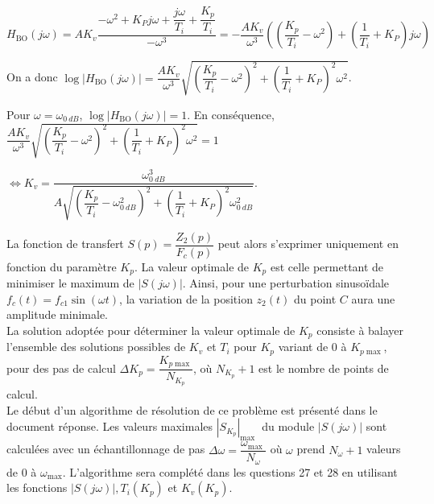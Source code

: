 \ifprof
\begin{corrige}
$H_{\text{BO}}(j\omega)=AK_v\dfrac{-\omega^2 + K_Pj\omega + \dfrac{j\omega}{T_i}+\dfrac{K_p}{T_i }}{-\omega^3}
=-\dfrac{AK_v}{\omega^3}  \left(\left(\dfrac{K_p}{T_i }-\omega^2 \right)+\left(\dfrac{1}{T_i}+ K_P\right)j\omega \right)$

On a donc 
$\log\left|H_{\text{BO}}(j\omega)\right|=\dfrac{AK_v}{\omega^3}  \sqrt{\left(\dfrac{K_p}{T_i }-\omega^2 \right)^2+\left(\dfrac{1}{T_i}+ K_P\right)^2\omega^2}$. 

Pour $\omega=\omega_{\SI{0}{dB}}$, $\log\left|H_{\text{BO}}(j\omega)\right|=1$. En conséquence, 
$\dfrac{AK_v}{\omega^3}  \sqrt{\left(\dfrac{K_p}{T_i }-\omega^2 \right)^2+\left(\dfrac{1}{T_i}+ K_P\right)^2\omega^2}=1 $

$\Leftrightarrow 
K_v  =\dfrac{\omega_{\SI{0}{dB}}^3}{A\sqrt{\left(\dfrac{K_p}{T_i }-\omega_{\SI{0}{dB}}^2 \right)^2+\left(\dfrac{1}{T_i}+ K_P\right)^2\omega_{\SI{0}{dB}}^2}}$.
\end{corrige}
\else
\fi

La fonction de transfert $S(p)=\dfrac{Z_{2}(p)}{F_{c}(p)}$ peut alors s'exprimer uniquement en fonction du paramètre $K_{p}$. La valeur optimale de $K_{p}$ est celle permettant de minimiser le maximum de $|S(j \omega)|$. Ainsi, pour une perturbation sinusoïdale $f_{c}(t)=f_{c 1} \sin (\omega t)$, la variation de la position $z_{2}(t)$ du point $C$ aura une amplitude minimale.\\
La solution adoptée pour déterminer la valeur optimale de $K_{p}$ consiste à balayer l'ensemble des solutions possibles de $K_{v}$ et $T_{i}$ pour $K_{p}$ variant de 0 à $K_{p \max }$, pour des pas de calcul $\Delta K_{p}=\dfrac{K_{p \max }}{N_{K_{p}}}$, où $N_{K_{p}}+1$ est le nombre de points de calcul.\\
Le début d'un algorithme de résolution de ce problème est présenté dans le document réponse. Les valeurs maximales $\left|S_{K_{p}}\right|_{\text {max }}$ du module $|S(j \omega)|$ sont calculées avec un échantillonnage de pas $\Delta \omega=\dfrac{\omega_{\text {max }}}{N_{\omega}}$ où $\omega$ prend $N_{\omega}+1$ valeurs de 0 à $\omega_{\max }$. L'algorithme sera complété dans les questions 27 et 28 en utilisant les fonctions $|S(j \omega)|, T_{i}\left(K_{p}\right)$ et $K_{v}\left(K_{p}\right)$.\\


